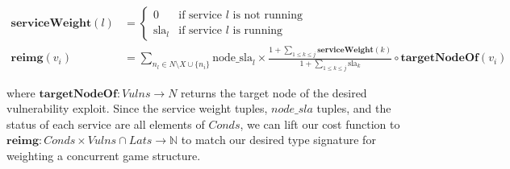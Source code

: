 \begin{align*}
\textbf{serviceWeight}(l) &= \begin{cases}
    0 & \text{if service } l \text{ is not running} \\
    \text{sla}_l & \text{if service } l \text{ is running}
\end{cases} \\[1ex]
\textbf{reimg}(v_i) &= \sum_{n_{l} \in N \setminus X \cup \{n_i\}} \text{node\_sla}_l \times \frac{1 + \sum_{1 \leq k \leq j} \textbf{serviceWeight}(k)}{1 + \sum_{1 \leq k \leq j} \text{sla}_k} \circ \textbf{targetNodeOf}(v_i)
\end{align*}



where $\textbf{targetNodeOf}: Vulns \rightarrow N$ returns the target node of the desired vulnerability exploit. Since the service weight tuples,   $node\_sla$ tuples, and the status of each service are all elements of $Conds$, we can lift our cost function to $\textbf{reimg}: Conds \times Vulns \cap Lats \rightarrow \mathbb{N}$ to match our desired type signature for weighting a concurrent game structure.
\newpage
